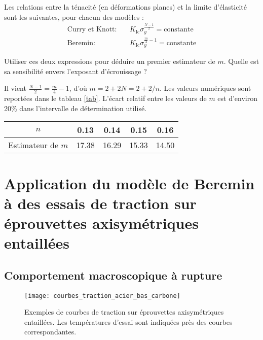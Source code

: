 \begin{questions}
Les relations entre la ténacité (en déformations planes) et la limite d’élasticité sont les suivantes, pour
chacun des modèles :
\begin{align*}
\text{Curry et Knott:}\quad & K_\text{Ic}\sigma_y^{\frac{N-1}{2}} = \text{constante}\\
\text{Beremin:}\quad & K_\text{Ic}\sigma_y^{\frac{m}{4}-1} = \text{constante}
\end{align*}

\question Utiliser ces deux expressions pour déduire un premier estimateur de $m$. Quelle est sa sensibilité
envers l’exposant d’écrouissage ?
\begin{solution}
Il vient $\frac{N-1}{2} = \frac{m}{4}-1$, d’où $m=2+2N=2+2/n$. Les valeurs numériques sont reportées dans le
tableau \ref{tab}. L’écart relatif entre les valeurs de $m$ est d’environ 20\% dans l’intervalle de détermination
utilisé.

\begin{R_table}
\begin{tabular}{|c|c|c|c|c|}
\hline 
$n$ & 0.13 & 0.14 & 0.15 & 0.16 \\ 
\hline 
Estimateur de $m$ & 17.38 & 16.29 & 15.33 & 14.50 \\ 
\hline 
\end{tabular}
\label{tab}
\end{R_table} 
\end{solution}
\end{questions}

\section{Application du modèle de Beremin à des essais de traction sur éprouvettes axisymétriques entaillées}

\subsection{Comportement macroscopique à rupture}

\begin{figure}
\begin{center}
\texttt{[image: courbes\_traction\_acier\_bas\_carbone]}
\end{center}
\caption{Exemples de courbes de traction sur éprouvettes axisymétriques entaillées. Les
températures d’essai sont indiquées près des courbes correspondantes.}\label{fig:traction-acier}
\end{figure}

